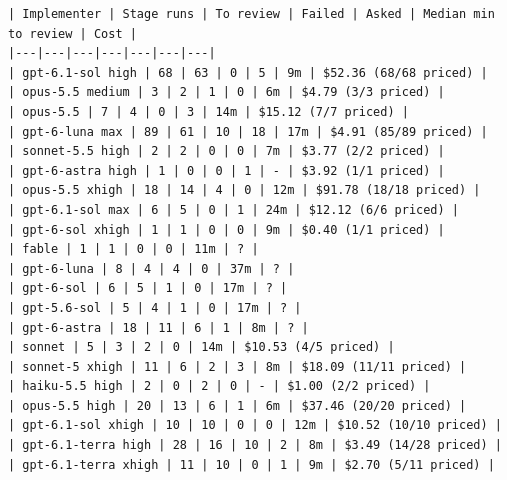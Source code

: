 \documentclass[11pt,a4paper]{article}
\begin{document}
{\tiny
\begin{verbatim}
| Implementer | Stage runs | To review | Failed | Asked | Median min to review | Cost |
|---|---|---|---|---|---|---|
| gpt-6.1-sol high | 68 | 63 | 0 | 5 | 9m | $52.36 (68/68 priced) |
| opus-5.5 medium | 3 | 2 | 1 | 0 | 6m | $4.79 (3/3 priced) |
| opus-5.5 | 7 | 4 | 0 | 3 | 14m | $15.12 (7/7 priced) |
| gpt-6-luna max | 89 | 61 | 10 | 18 | 17m | $4.91 (85/89 priced) |
| sonnet-5.5 high | 2 | 2 | 0 | 0 | 7m | $3.77 (2/2 priced) |
| gpt-6-astra high | 1 | 0 | 0 | 1 | - | $3.92 (1/1 priced) |
| opus-5.5 xhigh | 18 | 14 | 4 | 0 | 12m | $91.78 (18/18 priced) |
| gpt-6.1-sol max | 6 | 5 | 0 | 1 | 24m | $12.12 (6/6 priced) |
| gpt-6-sol xhigh | 1 | 1 | 0 | 0 | 9m | $0.40 (1/1 priced) |
| fable | 1 | 1 | 0 | 0 | 11m | ? |
| gpt-6-luna | 8 | 4 | 4 | 0 | 37m | ? |
| gpt-6-sol | 6 | 5 | 1 | 0 | 17m | ? |
| gpt-5.6-sol | 5 | 4 | 1 | 0 | 17m | ? |
| gpt-6-astra | 18 | 11 | 6 | 1 | 8m | ? |
| sonnet | 5 | 3 | 2 | 0 | 14m | $10.53 (4/5 priced) |
| sonnet-5 xhigh | 11 | 6 | 2 | 3 | 8m | $18.09 (11/11 priced) |
| haiku-5.5 high | 2 | 0 | 2 | 0 | - | $1.00 (2/2 priced) |
| opus-5.5 high | 20 | 13 | 6 | 1 | 6m | $37.46 (20/20 priced) |
| gpt-6.1-sol xhigh | 10 | 10 | 0 | 0 | 12m | $10.52 (10/10 priced) |
| gpt-6.1-terra high | 28 | 16 | 10 | 2 | 8m | $3.49 (14/28 priced) |
| gpt-6.1-terra xhigh | 11 | 10 | 0 | 1 | 9m | $2.70 (5/11 priced) |


\end{verbatim}}
\end{document}

